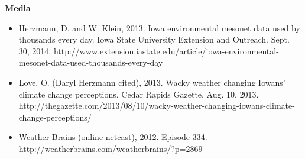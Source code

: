 \normalsize \sf
\normalsize \bf Media
\normalsize \sf
\begin{itemize}
\item Herzmann, D. and W. Klein, 2013. Iowa environmental mesonet data used by thousands every day. Iowa State University Extension and Outreach. Sept. 30, 2014. http://www.extension.iastate.edu/article/iowa-environmental-mesonet-data-used-thousands-every-day
\item Love, O. (Daryl Herzmann cited), 2013. Wacky weather changing Iowans’ climate change perceptions. Cedar Rapids Gazette. Aug. 10, 2013. http://thegazette.com/2013/08/10/wacky-weather-changing-iowans-climate-change-perceptions/
\item Weather Brains (online netcast), 2012. Episode 334. http://weatherbrains.com/weatherbrains/?p=2869
\end{itemize}

